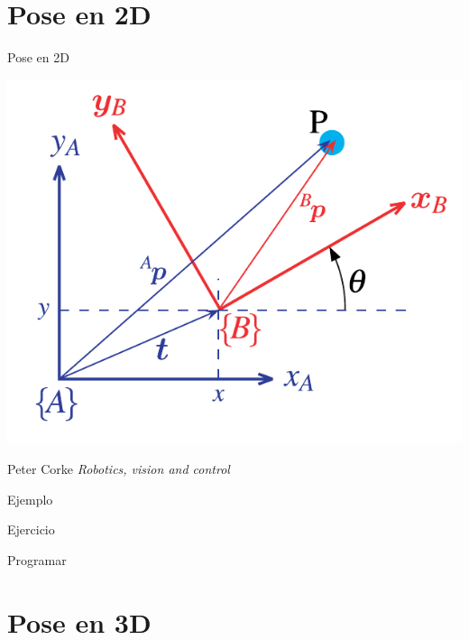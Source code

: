 \documentclass[presentation,aspectratio=169]{beamer}
\begin{document}
\section{Pose en 2D}
\label{sec:org6f888b3}

\begin{frame}[label={sec:orga3bfcfd}]{Pose en 2D}
\begin{center}
\includegraphics[height=0.5\textheight]{../figures/Corke-fig2.6.png}

\footnotesize Peter Corke \emph{Robotics, vision and control}
\end{center}
\end{frame}

\begin{frame}[label={sec:org5279996}]{Ejemplo}
\end{frame}


\begin{frame}[label={sec:org4562096}]{Ejercicio}
\end{frame}

\begin{frame}[label={sec:org5a851ac}]{Programar}
\end{frame}


\section{Pose en 3D}
\label{sec:org2afbba4}
\end{document}
